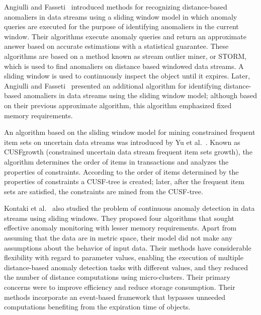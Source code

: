 Angiulli and Fasseti~\cite{angiulli2007detecting}
introduced methods for recognizing distance-based
anomaliers in data streams using a sliding window model in which
anomaly queries are executed for the purpose of
identifying anomaliers in the current window.
Their algorithms
execute anomaly queries and return an approximate answer based on accurate
estimations with a statistical guarantee.
These algorithms are based on a method
known as stream outlier miner,
or STORM,
which is used to find anomaliers on distance based
windowed data streams.
A sliding window is used to continuously inspect the
object until it expires.
Later,
Angiulli and Fasseti~\cite{angiulli2009detecting} presented
an additional algorithm for identifying distance-based anomaliers
in data streams using the sliding window
model; although based on their previous approximate algorithm,
this algorithm
emphasized fixed memory requirements.

An algorithm based on the sliding window model for
mining constrained frequent
item sets on uncertain data streams was introduced by
Yu et al.~\cite{yu2016uncertain}.
Known as CUSFgrowth
(constrained uncertain data stream frequent item sets growth),
the algorithm
determines the order of items in transactions and
analyzes the properties of constraints.
According to the order of items determined by
the properties of constraints a CUSF-tree
is created; later,
after the frequent item sets are satisfied,
the constraints are mined from
the CUSF-tree.

Kontaki et al.~\cite{kontaki2011continuous}
also studied the problem of continuous anomaly detection in
data streams using sliding windows.
They proposed four algorithms that sought effective
anomaly monitoring with lesser memory requirements.
Apart from assuming that the
data are in metric space,
their model did not make any assumptions about
the behavior of input data.
Their methods have considerable flexibility with
regard to parameter values,
enabling the execution of multiple distance-based
anomaly detection tasks
with different values,
and they reduced the number of distance computations using
micro-clusters.
Their primary concerns were to improve efficiency and
reduce storage
consumption.
Their methods incorporate an event-based framework that bypasses
unneeded computations benefiting from the expiration time of objects.

